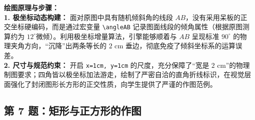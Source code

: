 \vspace{0.4cm}
{\small\color{blue!70!black}
\textbf{绘图原理与步骤：}\\
\textbf{1. 极坐标动态构建：} 面对原图中具有随机倾斜角的线段 $AB$，没有采用呆板的正交坐标硬编码，而是通过宏变量 \texttt{\textbackslash angleAB} 记录图面线段的倾角属性（根据原图测算约为 $12^\circ$微倾）。利用极坐标增量算法，引擎能够顺着与 $AB$ 呈现标准 $90^\circ$ 的物理夹角方向，“沉降”出两条等长的 $2\text{ cm}$ 垂边，彻底免疫了倾斜坐标系的运算误差。\\
\textbf{2. 尺寸与规范约束：} 开启 \texttt{x=1cm, y=1cm} 的尺度，充分保障了“宽是 $2\text{ cm}$”的物理制图要求；四角皆以极坐标加法游走，绘制了严密自洽的直角折线标识，在视觉层面强化了封闭图形长方形的正交性质，向学生提供了严谨的作图范例。
}

\newpage

\newpage

\subsection{第 7 题：矩形与正方形的作图}

